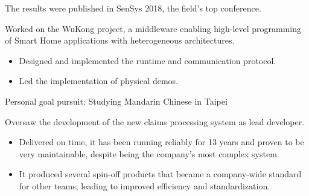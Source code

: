 \documentclass[10pt,a4paper]{../altacv}
\begin{document}
	\medskip
	
	The results were published in SenSys 2018, the field's top conference.
	
	\medskip
	
	
	\medskip
	

	\medskip

	Worked on the WuKong project, a middleware enabling high-level programming of Smart Home applications with heterogeneous architectures.
	
	\begin{itemize}
		\item Designed and implemented the runtime and communication protocol.
		\smallskip
		\item Led the implementation of physical demos.
	\end{itemize}
	
	\medskip
	
	
	\medskip
	
	
	
	
	\bigskip\bigskip{}
	
	Personal goal pursuit: Studying Mandarin Chinese in Taipei
	
	
	\bigskip\bigskip{}
	
	Oversaw the development of the new claims processing system as lead developer.
	
	\medskip
	
	\begin{itemize}
		\item Delivered on time, it has been running reliably for 13 years and proven to be very maintainable, despite being the company's most complex system.
		\smallskip
		\item It produced several spin-off products that became a company-wide standard for other teams, leading to improved efficiency and standardization.
	\end{itemize}
	
	\medskip
	
	
\end{document}
